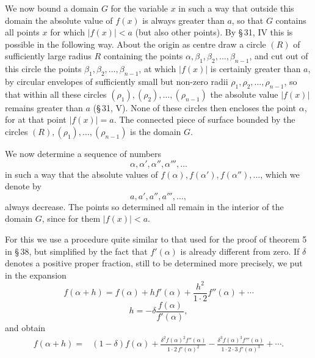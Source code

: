 \documentclass[11pt]{article}
\begin{document}
We now bound a domain $G$ for the variable $x$ in such a way that outside this domain the absolute value of $f(x)$ is always greater than $a$, so that $G$ contains all points $x$ for which $|f(x)|<a$ (but also other points). By \S\,31, IV this is possible in the following way. About the origin as centre draw a circle $(R)$ of sufficiently large radius $R$ containing the points $\alpha,\beta_1,\beta_2,
\ldots,\beta_{n-1}$, and cut out of this circle the points $\beta_1,\beta_2,
\ldots,\beta_{n-1}$, at which $|f(x)|$ is certainly greater than $a$, by circular envelopes of sufficiently small but non-zero radii $\rho_1,\rho_2,
\ldots,\rho_{n-1}$, so that within all these circles $(\rho_1),(\rho_2),\ldots,(\rho_{n-1})$ the absolute value $|f(x)|$ remains greater than $a$ (\S\,31, V). None of these circles then encloses the point $\alpha$, for at that point $|f(x)|=a$. The connected piece of surface bounded by the circles $(R),(\rho_1),\ldots,(\rho_{n-1})$ is the domain $G$.

We now determine a sequence of numbers
\[
 \alpha,\alpha',\alpha'',\alpha''',\ldots
\]
in such a way that the absolute values of $f(\alpha),f(\alpha'),f(\alpha''),\ldots$, which we denote by
\[
 a,a',a'',a''',\ldots,
\]
always decrease. The points so determined all remain in the interior of the domain $G$, since for them $|f(x)|<a$.

For this we use a procedure quite similar to that used for the proof of theorem 5 in \S\,38, but simplified by the fact that $f'(\alpha)$ is already different from zero. If $\delta$ denotes a positive proper fraction, still to be determined more precisely, we put in the expansion
\begin{equation}
 f(\alpha+h)=f(\alpha)+h f'(\alpha)+\frac{h^2}{1\cdot2}f''(\alpha)+\cdots
\tag{6}
\end{equation}
\begin{equation}
 h=-\delta\frac{f(\alpha)}{f'(\alpha)},
\tag{7}
\end{equation}
and obtain
\begin{align}
 f(\alpha+h)={}&(1-\delta)f(\alpha)
 +\frac{\delta^2 f(\alpha)^2 f''(\alpha)}{1\cdot2\,f'(\alpha)^2}
 -\frac{\delta^3 f(\alpha)^3 f'''(\alpha)}{1\cdot2\cdot3\,f'(\alpha)^3}+\cdots .
\tag{8}
\end{align}
\end{document}
